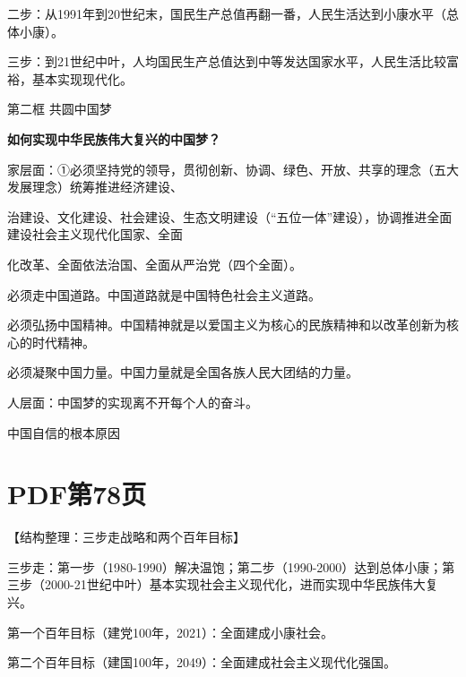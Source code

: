 \documentclass[lang=cn,11pt]{elegantbook}
\newcommand{\daofasym}[1]{{\daofasymbolfont #1}}
\newcommand{\daofasym}[1]{#1}
\begin{document}
二步：从1991年到20世纪末，国民生产总值再翻一番，人民生活达到小康水平（总体小康）。\par

三步：到21世纪中叶，人均国民生产总值达到中等发达国家水平，人民生活比较富裕，基本实现现代化。\par

第二框 共圆中国梦\par

\textbf{如何实现中华民族伟大复兴的中国梦？}\par

家层面：\daofasym{①}必须坚持党的领导，贯彻创新、协调、绿色、开放、共享的理念（五大发展理念）统筹推进经济建设、\par

治建设、文化建设、社会建设、生态文明建设（“五位一体”建设），协调推进全面建设社会主义现代化国家、全面\par

化改革、全面依法治国、全面从严治党（四个全面）。\par

必须走中国道路。中国道路就是中国特色社会主义道路。\par

必须弘扬中国精神。中国精神就是以爱国主义为核心的民族精神和以改革创新为核心的时代精神。\par

必须凝聚中国力量。中国力量就是全国各族人民大团结的力量。\par

人层面：中国梦的实现离不开每个人的奋斗。\par

中国自信的根本原因\par


\section*{PDF第78页}

【结构整理：三步走战略和两个百年目标】\par

三步走：第一步（1980-1990）解决温饱；第二步（1990-2000）达到总体小康；第三步（2000-21世纪中叶）基本实现社会主义现代化，进而实现中华民族伟大复兴。\par

第一个百年目标（建党100年，2021）：全面建成小康社会。\par

第二个百年目标（建国100年，2049）：全面建成社会主义现代化强国。\par
\end{document}
